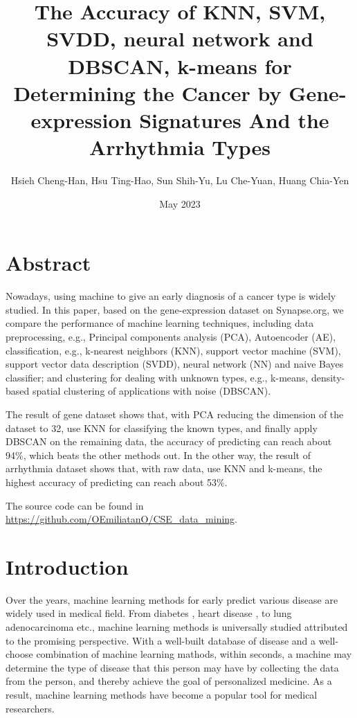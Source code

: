 \documentclass[twocolumn,10pt]{article}
\begin{document}
\title{The Accuracy of KNN, SVM, SVDD, neural network and DBSCAN, k-means for Determining the Cancer by Gene-expression Signatures And the Arrhythmia Types}

\author{Hsieh Cheng-Han, Hsu Ting-Hao, Sun Shih-Yu, Lu Che-Yuan, Huang Chia-Yen}
\date{May 2023}
\maketitle

\section*{Abstract}
Nowadays, using machine to give an early diagnosis of a cancer type is widely studied. 
In this paper, based on the gene-expression dataset on Synapse.org, we compare the performance of machine 
learning techniques, including data preprocessing, e.g., Principal components analysis (PCA), Autoencoder 
(AE), classification, e.g., k-nearest neighbors (KNN), support vector machine (SVM), support vector data 
description (SVDD), neural network (NN) and naive Bayes classifier; and clustering for dealing with unknown 
types, e.g., k-means, density-based spatial clustering of applications with noise (DBSCAN). 

The result of gene dataset shows that, with PCA reducing the dimension of the dataset to 32, use KNN for 
classifying the known types, and finally apply DBSCAN on the remaining data, the accuracy of predicting 
can reach about 94\%, which beats the other methods out. In the other way, the result of arrhythmia 
dataset shows that, with raw data, use KNN and k-means, the highest accuracy of predicting can reach about 
53\%.

The source code can be found in \href{https://github.com/OEmiliatanO/CSE\_data\_mining}{https://github.com/OEmiliatanO/CSE\_data\_mining}.

\section{Introduction}
\label{sec:Introduction}
Over the years, machine learning methods for early predict various disease are widely used in medical field. 
\cite{kourou2015machine} \cite{cruz2006applications} From diabetes \cite{kavakiotis2017machine}, 
heart disease \cite{learning2017heart}, to lung adenocarcinoma \cite{huang2020machine} etc., machine learning 
methods is universally studied attributed to the promising perspective. With a well-built database of disease 
and a well-choose combination of machine learning mathods, within seconds, a machine may determine the type of 
disease that this person may have by collecting the data from the person, and thereby achieve the goal of 
personalized medicine. As a result, machine learning methods have become a popular tool for medical researchers. 
\end{document}
